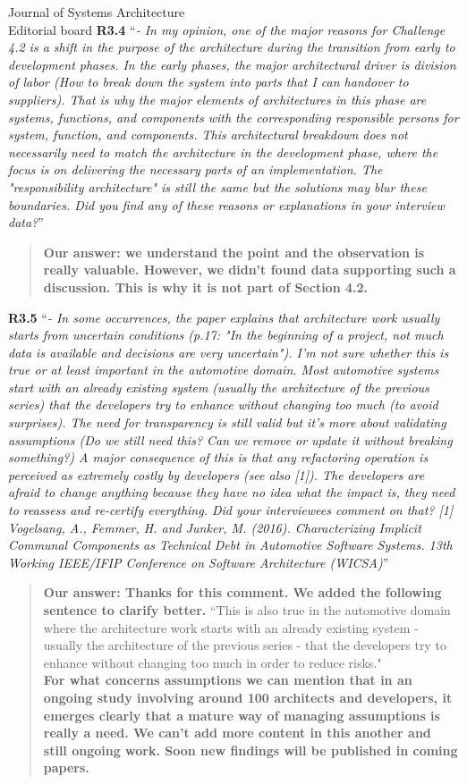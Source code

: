 \documentclass[a4paper,10pt]{letter}
\begin{document}
\begin{letter}{Journal of Systems Architecture\\
    Editorial board}
\textbf{R3.4} ``\textit{- In my opinion, one of the major reasons for Challenge 4.2 is a shift in the purpose of the architecture during the transition from early to development phases. In the early phases, the major architectural driver is division of labor (How to break down the system into parts that I can handover to suppliers). That is why the major elements of architectures in this phase are systems, functions, and components with the corresponding responsible persons for system, function, and components. This architectural breakdown does not necessarily need to match the architecture in the development phase, where the focus is on delivering the necessary parts of an implementation. The "responsibility architecture" is still the same but the solutions may blur these boundaries. Did you find any of these reasons or explanations in your interview data?}''
\begin{quote}
\textbf{Our answer: we understand the point and the observation is really valuable. However, we didn't found data supporting such a discussion. This is why it is not part of Section 4.2.}
\end{quote}

\textbf{R3.5} ``\textit{- In some occurrences, the paper explains that architecture work usually starts from uncertain conditions (p.17: "In the beginning of a project, not much data is available and decisions are very uncertain"). I'm not sure whether this is true or at least important in the automotive domain. Most automotive systems start with an already existing system (usually the architecture of the previous series) that the developers try to enhance without changing too much (to avoid surprises). The need for transparency is still valid but it's more about validating assumptions (Do we still need this? Can we remove or update it without breaking something?) A major consequence of this is that any refactoring operation is perceived as extremely costly by developers (see also [1]). The developers are afraid to change anything because they have no idea what the impact is, they need to reassess and re-certify everything. Did your interviewees comment on that? 
[1] Vogelsang, A., Femmer, H. and Junker, M. (2016). Characterizing Implicit Communal Components as Technical Debt in Automotive Software Systems. 13th Working IEEE/IFIP Conference on Software Architecture (WICSA)}''
\begin{quote}
\textbf{Our answer: Thanks for this comment. We added the following sentence to clarify better.} ``This is also true in the automotive domain where the architecture work starts with an already existing system - usually the architecture of the previous series - that the developers try to enhance without changing too much in order to reduce risks."\\
\textbf{For what concerns assumptions we can mention that in an ongoing study involving around 100 architects and developers, it emerges clearly that a mature way of managing assumptions is really a need. We can't add more content in this another and still ongoing work. Soon new findings will be published in coming papers.}
\end{quote}


\end{letter}
\end{document}
